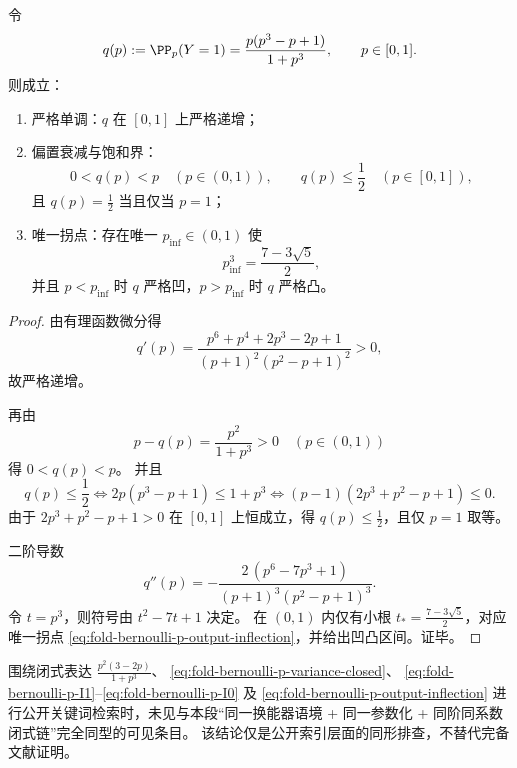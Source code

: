 \begin{theorem}\label{thm:fold-bernoulli-p-output-density-concavity-switch}
令
\[
q(p):=\PP_p(Y=1)=\frac{p(p^3-p+1)}{1+p^3},\qquad p\in[0,1].
\]
则成立：
\begin{enumerate}
  \item 严格单调：\(q\) 在 \([0,1]\) 上严格递增；
  \item 偏置衰减与饱和界：
  \[
  0<q(p)<p\quad(p\in(0,1)),\qquad
  q(p)\le \frac12\quad(p\in[0,1]),
  \]
  且 \(q(p)=\tfrac12\) 当且仅当 \(p=1\)；
  \item 唯一拐点：存在唯一 \(p_{\mathrm{inf}}\in(0,1)\) 使
  \begin{equation}\label{eq:fold-bernoulli-p-output-inflection}
  p_{\mathrm{inf}}^3=\frac{7-3\sqrt5}{2},
  \end{equation}
  并且 \(p<p_{\mathrm{inf}}\) 时 \(q\) 严格凹，\(p>p_{\mathrm{inf}}\) 时 \(q\) 严格凸。
\end{enumerate}
\end{theorem}
\begin{proof}
由有理函数微分得
\[
q'(p)=\frac{p^6+p^4+2p^3-2p+1}{(p+1)^2(p^2-p+1)^2}>0,
\]
故严格递增。

再由
\[
p-q(p)=\frac{p^2}{1+p^3}>0\quad(p\in(0,1))
\]
得 \(0<q(p)<p\)。
并且
\[
q(p)\le \frac12
\iff
2p(p^3-p+1)\le 1+p^3
\iff
(p-1)(2p^3+p^2-p+1)\le 0.
\]
由于 \(2p^3+p^2-p+1>0\) 在 \([0,1]\) 上恒成立，得 \(q(p)\le \tfrac12\)，且仅 \(p=1\) 取等。

二阶导数
\[
q''(p)=
-\frac{2\,(p^6-7p^3+1)}{(p+1)^3(p^2-p+1)^3}.
\]
令 \(t=p^3\)，则符号由 \(t^2-7t+1\) 决定。
在 \((0,1)\) 内仅有小根
\(
t_\ast=\frac{7-3\sqrt5}{2}
\)，对应唯一拐点
\eqref{eq:fold-bernoulli-p-output-inflection}，并给出凹凸区间。证毕。
\end{proof}

\begin{remark}[公开索引同形排查说明]\label{rem:fold-bernoulli-p-closed-form-public-index-note}
围绕闭式表达
\(
\frac{p^2(3-2p)}{1+p^3}
\)、
\eqref{eq:fold-bernoulli-p-variance-closed}、
\eqref{eq:fold-bernoulli-p-I1}--\eqref{eq:fold-bernoulli-p-I0}
及
\eqref{eq:fold-bernoulli-p-output-inflection}
进行公开关键词检索时，未见与本段“同一换能器语境 + 同一参数化 + 同阶同系数闭式链”完全同型的可见条目。
该结论仅是公开索引层面的同形排查，不替代完备文献证明。
\end{remark}

\endinput

